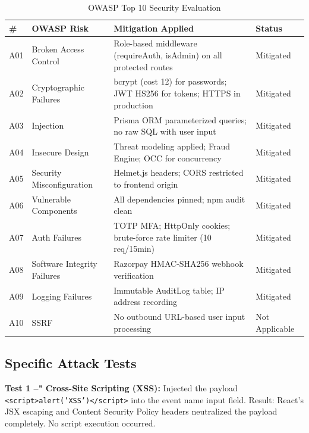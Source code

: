 \documentclass[12pt,a4paper]{report}
\begin{document}
\begin{table}[H]
    \centering
    \caption{OWASP Top 10 Security Evaluation}
    \vspace{0.2cm}
    \begin{tabular}{|p{1cm}|p{4.5cm}|p{4.5cm}|p{3cm}|}
        \hline
        \textbf{\#} & \textbf{OWASP Risk} & \textbf{Mitigation Applied} & \textbf{Status} \\
        \hline
        A01 & Broken Access Control & Role-based middleware (requireAuth, isAdmin) on all protected routes & Mitigated \\
        \hline
        A02 & Cryptographic Failures & bcrypt (cost 12) for passwords; JWT HS256 for tokens; HTTPS in production & Mitigated \\
        \hline
        A03 & Injection & Prisma ORM parameterized queries; no raw SQL with user input & Mitigated \\
        \hline
        A04 & Insecure Design & Threat modeling applied; Fraud Engine; OCC for concurrency & Mitigated \\
        \hline
        A05 & Security Misconfiguration & Helmet.js headers; CORS restricted to frontend origin & Mitigated \\
        \hline
        A06 & Vulnerable Components & All dependencies pinned; npm audit clean & Mitigated \\
        \hline
        A07 & Auth Failures & TOTP MFA; HttpOnly cookies; brute-force rate limiter (10 req/15min) & Mitigated \\
        \hline
        A08 & Software Integrity Failures & Razorpay HMAC-SHA256 webhook verification & Mitigated \\
        \hline
        A09 & Logging Failures & Immutable AuditLog table; IP address recording & Mitigated \\
        \hline
        A10 & SSRF & No outbound URL-based user input processing & Not Applicable \\
        \hline
    \end{tabular}
\end{table}

\subsection{Specific Attack Tests}

\textbf{Test 1 --" Cross-Site Scripting (XSS):}
Injected the payload \texttt{<script>alert('XSS')</script>} into the event name input field. Result: React's JSX escaping and Content Security Policy headers neutralized the payload completely. No script execution occurred.
\end{document}
